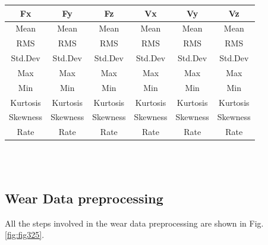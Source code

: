 \documentclass[preprint,review,12pt]{elsarticle}
\begin{document}
\begin{minipage}{\linewidth}
   \label{tab:T36}
  \centering
    \begin{tabular}{ c c c c c c }
    	\hline
    	Fx & Fy & Fz & Vx & Vy & Vz \\
    	\hline\hline
     	Mean & Mean & Mean & Mean & Mean & Mean \\
     	\hline
     	RMS & RMS & RMS & RMS & RMS & RMS \\
     	\hline
      Std.Dev & Std.Dev & Std.Dev & Std.Dev & Std.Dev & Std.Dev \\
      \hline
      Max & Max & Max & Max & Max & Max \\
      \hline
      Min & Min & Min & Min & Min & Min \\
      \hline
      Kurtosis & Kurtosis & Kurtosis & Kurtosis & Kurtosis & Kurtosis \\
      \hline
      Skewness & Skewness & Skewness & Skewness & Skewness & Skewness \\
      \hline
      Rate & Rate & Rate & Rate & Rate & Rate \\
      \hline
    \end{tabular}
\end{minipage} \\\\

\subsection{Wear Data preprocessing}\label{sec:sec42}
All the steps involved in the wear data preprocessing are shown in Fig. \ref{fig:fig325}. \par
\end{document}
